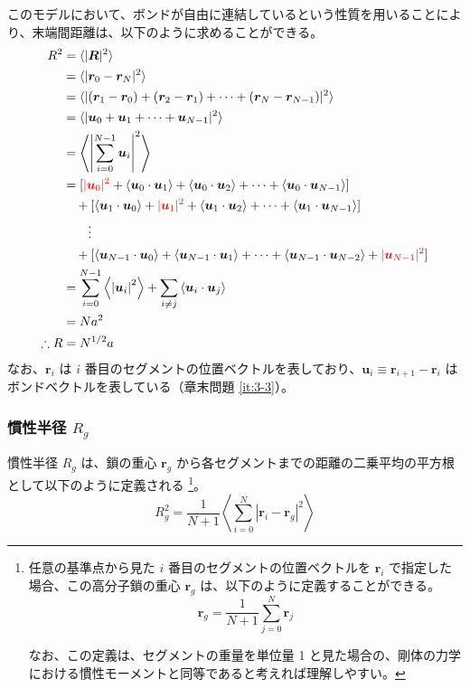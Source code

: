 \documentclass[a4paper,11pt]{jlreq}
\begin{document}
このモデルにおいて、ボンドが自由に連結しているという性質を用いることにより、末端間距離は、以下のように求めることができる。
\begin{align}
R^2
	&= \langle |\bm{R}|^2 \rangle \notag \\
	&=\langle |\bm{r}_0 - \bm{r}_N|^2 \rangle \notag \\
	&=\langle |(\bm{r}_1 - \bm{r}_0) + (\bm{r}_2 - \bm{r}_1) + \cdots + (\bm{r}_N - \bm{r}_{N-1})|^2 \rangle \notag \\
	&=\langle |\bm{u}_0 + \bm{u}_1 + \cdots + \bm{u}_{N-1}|^2 \rangle \notag \\
	&=\left\langle \left|\sum_{i=0}^{N-1}\bm{u}_i \right|^2 \right\rangle \notag \\
	&= 
		[ 
		{\color{red} |\bm{u}_0|^2} + \langle \bm{u}_0 \cdot \bm{u}_1 \rangle + \langle \bm{u}_0 \cdot \bm{u}_2 \rangle + \cdots + \langle \bm{u}_0 \cdot \bm{u}_{N-1} \rangle 
		] \notag \\
	&\quad+ 
		[ 
		\langle \bm{u}_1 \cdot \bm{u}_0 \rangle + {\color{red} |\bm{u}_1|^2} + \langle \bm{u}_1 \cdot \bm{u}_2 \rangle + \cdots + \langle \bm{u}_1 \cdot \bm{u}_{N-1} \rangle 
		] \notag \\
	&\quad\quad \vdots \notag \\
	&\quad+ 
		[ 
		\langle \bm{u}_{N-1} \cdot \bm{u}_0 \rangle + \langle \bm{u}_{N-1} \cdot \bm{u}_1 \rangle + \cdots + \langle \bm{u}_{N-1} \cdot \bm{u}_{N-2} \rangle + {\color{red} |\bm{u}_{N-1}|^2} 
		] \notag \\
	&=\sum_{i=0}^{N-1} \left\langle \left|\bm{u}_i \right|^2 \right\rangle 
	+\sum_{i \neq j} \left\langle \bm{u}_i \cdot \bm{u}_j \right\rangle \notag \\
	&= N a^2 \notag \\
\therefore R &= N^{1/2}a
\label{eq:r2}
\end{align}
なお、$\bm{r}_i$ は $i$ 番目のセグメントの位置ベクトルを表しており、$\bm{u}_i \equiv \bm{r}_{i+1} - \bm{r}_i$ はボンドベクトルを表している（章末問題 \ref{it:3-3}）。

\subsubsection{慣性半径 $R_g$}

慣性半径 $R_g$ は、鎖の重心 $\bm{r}_g$ から各セグメントまでの距離の二乗平均の平方根として以下のように定義される
\footnote
{
任意の基準点から見た $i$ 番目のセグメントの位置ベクトルを $\bm{r}_i$ で指定した場合、この高分子鎖の重心 $\bm{r}_g$ は、以下のように定義することができる。
\begin{equation*}
\bm{r}_g = \dfrac{1}{N+1} \sum_{j=0}^{N} \bm{r}_j
\end{equation*}

なお、この定義は、セグメントの重量を単位量 1 と見た場合の、剛体の力学における慣性モーメントと同等であると考えれば理解しやすい。
}。
\begin{equation*}
R_g^2 = \dfrac{1}{N+1} \left\langle \sum_{i=0}^{N} |\bm{r}_i - \bm{r}_g|^2 \right\rangle
\end{equation*}
\end{document}
